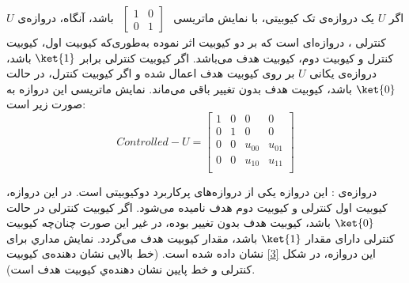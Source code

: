 \begin{itemize}
 اگر $U$ یک دروازه‌ی تک کیوبیتی، با نمایش ماتریسی
 $
  \begin{smallmatrix}
  \begin{bmatrix}
1 & 0 \\
0 & 1
\end{bmatrix}
\end{smallmatrix}
$
باشد، آنگاه، دروازه‌ی $U$ کنترلی ، دروازه‌ای است که بر دو کیوبیت اثر نموده به‌طوری‌که کیوبیت اول، کیوبیت کنترل و کیوبیت دوم، کیوبیت هدف می‌باشد. اگر کیوبیت کنترلی برابر $\ket{1}$ باشد، دروازه‌ی یکانی $U$ بر روی کیوبیت هدف اعمال شده و اگر کیوبیت کنترل، در حالت $\ket{0}$ باشد، کیوبیت هدف بدون تغییر باقی می‌ماند. نمایش ماتریسی این دروازه به صورت زیر است:
\begin{equation}
Controlled-U=
\begin{bmatrix}
1&0&0&0\\
0&1&0&0\\
0&0&u_{00}&u_{01}\\
0&0&u_{10}&u_{11}\\
\end{bmatrix}
\end{equation} 

دروازه‌ی : این دروازه یکی از دروازه‌های پرکاربرد دوکیوبیتی است. در این دروازه، کیوبیت اول کنترلی و کیو‌بیت دوم هدف نامیده می‌شود. اگر کیوبیت کنترلی در حالت $\ket{0}$  باشد، کیوبیت هدف بدون تغییر بوده، در غیر این صورت چنان‌چه کیو‌بیت کنترلی دارای مقدار $\ket{1}$ باشد، مقدار کیوبیت هدف  می‌گردد. نمایش مداري برای این دروازه، در شکل \ref{3} نشان داده شده است. (خط بالایی نشان دهنده‌ی کیوبیت کنترلی و خط پایین نشان دهنده‌ي کیوبیت هدف است).

\begin{figure}[h]
\begin{center}
\end{center}
\end{figure}
\end{itemize}
